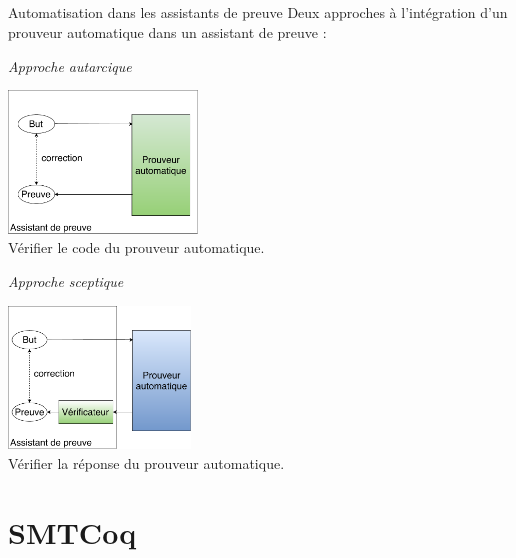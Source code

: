 \documentclass{beamer}
\begin{document}
    \subsection{}
    \begin{frame}{Automatisation dans les assistants de preuve}
      Deux approches à l'intégration d'un prouveur automatique dans un assistant de preuve :
      \begin{multicols}{2}
        \begin{center}
          \textit{Approche autarcique}
        \end{center}
        \includegraphics[height=3.8cm]{1_Autarcique.pdf}\\
        Vérifier le code du prouveur automatique. \\
        \begin{center}
          \textit{Approche sceptique}
        \end{center}
        \includegraphics[height=3.8cm]{2_Sceptique.pdf}\\
        Vérifier la réponse du prouveur automatique.
      \end{multicols}
    \end{frame}



    \section{SMTCoq}
\end{document}
